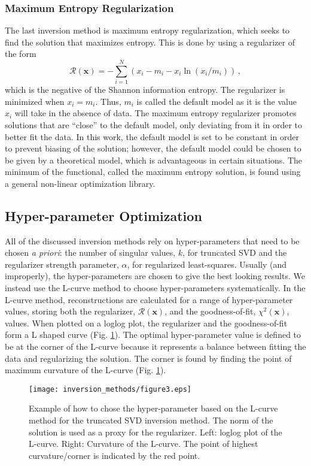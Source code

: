 \subsubsection{Maximum Entropy Regularization}
The last inversion method is maximum entropy regularization, which seeks to find the solution that maximizes entropy. This is done by using a regularizer of the form 
\begin{equation}
	\mathcal{R}(\mathbf{x}) = -\sum_{i=1}^N (x_i-m_i-x_i\ln(x_i/m_i)) \, ,
\end{equation}
which is the negative of the Shannon information entropy. 
The regularizer is minimized when $x_i = m_i$. Thus, $m_i$ is called the default model as it is the value $x_i$ will take in the absence of data. The maximum entropy regularizer promotes solutions that are ``close'' to the default model, only deviating from it in order to better fit the data. In this work, the default model is set to be constant in order to prevent biasing of the solution; however, the default model could be chosen to be given by a theoretical model, which is advantageous in certain situations. 
The minimum of the functional, called the maximum entropy solution, is found using a general non-linear optimization library\cite{giffin2007updating,wachter2006ipopt,LubinDunningIJOC}.

\subsection{Hyper-parameter Optimization}
All of the discussed inversion methods rely on hyper-parameters that need to be chosen \textit{a priori}: the number of singular values, $k$, for truncated SVD and the regularizer strength parameter, $\alpha$, for regularized  least-squares. Usually (and improperly), the hyper-parameters are chosen to give the best looking results. We instead use the L-curve method\cite{Hansen2007} to choose hyper-parameters systematically. 
In the L-curve method, reconstructions are calculated for a range of hyper-parameter values, storing both the regularizer, $\mathcal{R}(\mathbf{x})$, and the goodness-of-fit, $\chi^2(\mathbf{x})$, values. When plotted on a loglog plot, the regularizer and the goodness-of-fit form a L shaped curve (Fig. \ref{fig:L_curve}). The optimal hyper-parameter value is defined to be at the corner of the L-curve because it represents a balance between fitting the data and regularizing the solution. The corner is found by finding the point of maximum curvature of the L-curve (Fig. \ref{fig:L_curve}).
\begin{figure}[h!]
    \centering
    \texttt{[image: inversion\_methods/figure3.eps]}
    \caption{Example of how to chose the hyper-parameter based on the L-curve method for the truncated SVD inversion method. The norm of the solution is used as a proxy for the regularizer. Left: loglog plot of the L-curve. Right: Curvature of the L-curve. The point of highest curvature/corner is indicated by the red point.}
    \label{fig:L_curve}
\end{figure}

